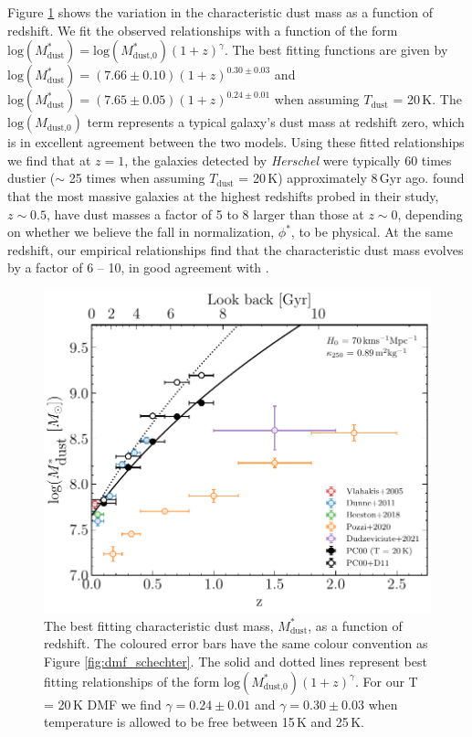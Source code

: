 Figure \ref{fig:dmf_m_evolution} shows the variation in the characteristic dust mass as a function of redshift. We fit the observed relationships with a function of the form $\textrm{log}(M_{\textrm{dust}}^*) = \textrm{log}(M_{\textrm{dust,0}}^*)(1+z)^\gamma$. The best fitting functions are given by $\textrm{log}(M_{\textrm{dust}}^*) = (7.66\pm0.10)(1+z)^{0.30\pm0.03}$ and $\textrm{log}(M_{\textrm{dust}}^*) = (7.65\pm0.05)(1+z)^{0.24\pm0.01}$ when assuming $T_{\textrm{dust}}$ = 20\,K. The $\textrm{log}(M_{\textrm{dust,0}})$ term represents a typical galaxy's dust mass at redshift zero, which is in excellent agreement between the two models. Using these fitted relationships we find that at $z = 1$, the galaxies detected by \textit{Herschel} were typically 60 times dustier ($\sim$ 25 times when assuming $T_{\textrm{dust}}$ = 20\,K) approximately 8\,Gyr ago. \citealt{Dunne_2011} found that the most massive galaxies at the highest redshifts probed in their study, $z \sim 0.5$, have dust masses a factor of 5 to 8 larger than those at $z \sim 0$, depending on whether we believe the fall in normalization, $\phi^*$, to be physical. At the same redshift, our empirical relationships find that the characteristic dust mass evolves by a factor of 6 -- 10, in good agreement with \citealt{Dunne_2011}.

\begin{figure}
	\centering
	\includegraphics[width=0.75\columnwidth]{Figures/dmf_m_evolution.pdf}
	\caption[Evolution of the characteristic dust mass, $M_\textrm{dust}^*$, as a function of redshift]{The best fitting characteristic dust mass, $M_\textrm{dust}^*$, as a function of redshift. The coloured error bars have the same colour convention as Figure \ref{fig:dmf_schechter}. The solid and dotted lines represent best fitting relationships of the form $\textrm{log}(M_{\textrm{dust,0}}^*)(1+z)^\gamma$. For our T = 20\,K DMF we find $\gamma = 0.24\pm0.01$ and $\gamma = 0.30\pm0.03$ when temperature is allowed to be free between 15\,K and 25\,K.}
	\label{fig:dmf_m_evolution}
\end{figure}


